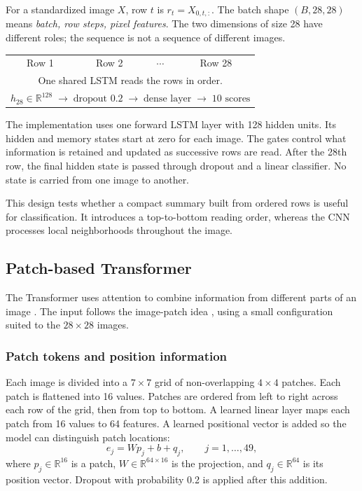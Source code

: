 For a standardized image $X$, row $t$ is
$r_t=X_{0,t,:}$. The batch shape $(B,28,28)$ means
\emph{batch, row steps, pixel features}. The two dimensions of size 28 have
different roles; the sequence is not a sequence of different images.

\begin{center}
\small
\begin{tabular}{c@{\ $\longrightarrow$\ }c@{\ $\longrightarrow$\ }c@{\ $\longrightarrow$\ }c}
Row 1 & Row 2 & $\cdots$ & Row 28\\
\multicolumn{4}{c}{One shared LSTM reads the rows in order.}\\[5pt]
\multicolumn{4}{c}{$h_{28}\in\mathbb{R}^{128}
\;\longrightarrow\; \text{dropout }0.2
\;\longrightarrow\; \text{dense layer}
\;\longrightarrow\; 10\text{ scores}$}
\end{tabular}
\end{center}

The implementation uses one forward LSTM layer with 128 hidden units. Its
hidden and memory states start at zero for each image. The gates control what
information is retained and updated as successive rows are read. After the
28th row, the final hidden state is passed through dropout and a linear
classifier. No state is carried from one image to another.

This design tests whether a compact summary built from ordered rows is useful
for classification. It introduces a top-to-bottom reading order, whereas the
CNN processes local neighborhoods throughout the image.

\clearpage
\subsection{Patch-based Transformer}
The Transformer uses attention to combine information from different parts of
an image \cite{fresh_attention}. The input follows the image-patch idea
\cite{fresh_vit}, using a small configuration suited to the $28\times28$ images.

\subsubsection{Patch tokens and position information}
Each image is divided into a $7\times7$ grid of non-overlapping $4\times4$
patches. Each patch is flattened into 16 values. Patches are ordered from left
to right across each row of the grid, then from top to bottom.
A learned linear layer maps each patch from 16 values to 64 features.
A learned positional vector is added so the model can distinguish patch
locations:
\[
e_j=Wp_j+b+q_j,\qquad j=1,\ldots,49,
\]
where $p_j\in\mathbb{R}^{16}$ is a patch,
$W\in\mathbb{R}^{64\times16}$ is the projection, and
$q_j\in\mathbb{R}^{64}$ is its position vector.
Dropout with probability 0.2 is applied after this addition.

